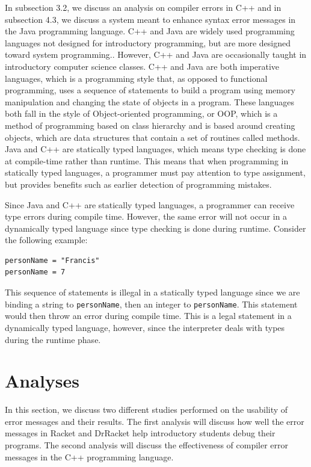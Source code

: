 \documentclass{sig-alternate}
\begin{document}
In subsection 3.2, we discuss an analysis on compiler errors in C++ and in subsection 4.3, we discuss a system meant to enhance syntax error messages in the Java programming language.
C++ and Java are widely used programming languages not designed for introductory programming, but are more designed toward system programming..
However, C++ and Java are occasionally taught in introductory computer science classes.
C++ and Java are both imperative languages, which is a programming style that, as opposed to functional programming, uses a sequence of statements to build a program using memory manipulation and changing the state of objects in a program.
These languages both fall in the style of Object-oriented programming, or OOP, which is a method of programming based on class hierarchy and is based around creating objects, which are data structures that contain a set of routines called methods. 
Java and C++ are statically typed languages, which means type checking is done at compile-time rather than runtime. 
This means that when programming in statically typed languages, a programmer must pay attention to type assignment, but provides benefits such as earlier detection of programming mistakes.

Since Java and C++ are statically typed languages, a programmer can receive type errors during compile time.
However, the same error will not occur in a dynamically typed language since type checking is done during runtime.
Consider the following example:

\begin{verbatim}
personName = "Francis"
personName = 7
\end{verbatim}

This sequence of statements is illegal in a statically typed language since we are binding a string to \texttt{personName}, then an integer to \texttt{personName}.
This statement would then throw an error during compile time.
This is a legal statement in a dynamically typed language, however, since the interpreter deals with types during the runtime phase. 


\section{Analyses}\label{sec:analyses}
In this section, we discuss two different studies performed on the usability of error messages and their results.
The first analysis will discuss how well the error messages in Racket and DrRacket help introductory students debug their programs.
The second analysis will discuss the effectiveness of compiler error messages in the C++ programming language. 
\end{document}
